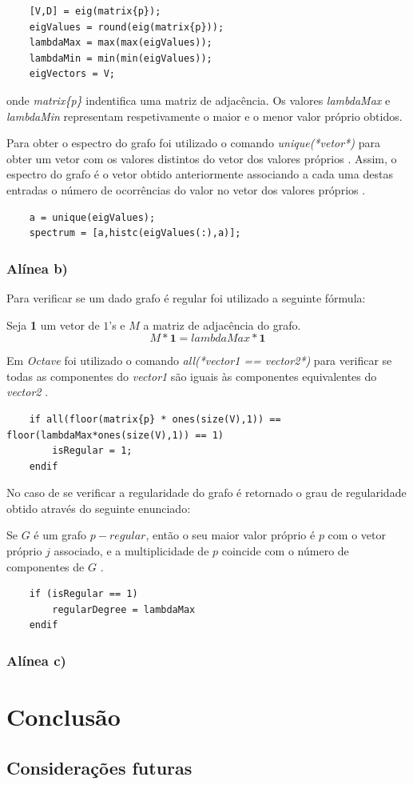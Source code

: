 \documentclass[a4paper,12pt]{report}
\begin{document}
\begin{lstlisting}
    [V,D] = eig(matrix{p});
    eigValues = round(eig(matrix{p}));
    lambdaMax = max(max(eigValues));
    lambdaMin = min(min(eigValues));
    eigVectors = V;
\end{lstlisting} onde \textit{matrix\{p\}} indentifica uma matriz de adjacência. Os valores \textit{lambdaMax} e \textit{lambdaMin} representam respetivamente o maior e o menor valor próprio obtidos.

Para obter o espectro do grafo foi utilizado o comando \textit{unique(*vetor*)} para obter um vetor com os valores distintos do vetor dos valores próprios \cite{WEBSITE2}.
Assim, o espectro do grafo é o vetor obtido anteriormente associando a cada uma destas entradas o número de ocorrências do valor no vetor dos valores próprios \cite{WEBSITE3}.

\begin{lstlisting}
    a = unique(eigValues);
    spectrum = [a,histc(eigValues(:),a)];
\end{lstlisting}

\subsection*{Alínea b)}

Para verificar se um dado grafo é regular foi utilizado a seguinte fórmula:

Seja \textbf{1} um vetor de $1$'s e $M$ a matriz de adjacência do grafo.
\begin{equation}
    M*\textbf{1} = \textit{lambdaMax}*\textbf{1}
\end{equation}

Em \textit{Octave} foi utilizado o comando \textit{all(*vector1 == vector2*)} para verificar se todas as componentes do \textit{vector1} são iguais às componentes equivalentes do \textit{vector2} \cite{WEBSITE4}.

\begin{lstlisting}
    if all(floor(matrix{p} * ones(size(V),1)) == floor(lambdaMax*ones(size(V),1)) == 1)
        isRegular = 1;
    endif
\end{lstlisting}

No caso de se verificar a regularidade do grafo é retornado o grau de regularidade obtido através do seguinte enunciado:

\begin{center}
    Se $G$ é um grafo $p-regular$, então o seu maior valor próprio é $p$ com o vetor próprio $j$ associado, e a multiplicidade de $p$ coincide com o número de componentes de $G$ \cite{WEBSITE5}.
\end{center}

\begin{lstlisting}
    if (isRegular == 1)
        regularDegree = lambdaMax
    endif
\end{lstlisting}

\subsection*{Alínea c)}

\chapter{Conclusão}

\section{Considerações futuras}


\end{document}
